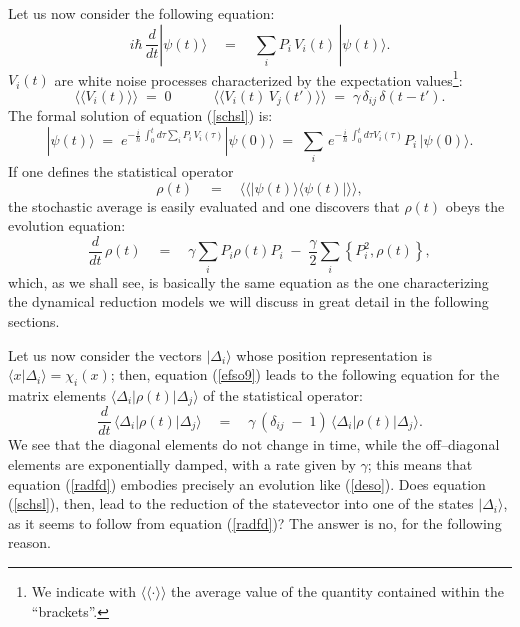 \documentclass[10pt,a4paper]{article}
\newcommand{\llangle}{\langle\!\langle}
\newcommand{\rrangle}{\rangle\!\rangle}
\begin{document}
Let us now consider the following equation:
\begin{equation} \label{schsl}
i\hbar\,\frac{d}{dt}|\psi(t)\rangle \quad = \quad \sum_{i} P_{i}
\, V_{i}(t)\, |\psi(t)\rangle.
\end{equation}
$V_{i}(t)$ are white noise processes characterized by the
expectation values\footnote{We indicate with $\llangle \cdot
\rrangle$ the average value of the quantity contained within the
``brackets''.}:
\begin{equation}
\llangle V_{i}(t) \rrangle \; = \; 0 \qquad\quad \llangle
V_{i}(t)\, V_{j}(t') \rrangle \; = \;
\gamma\,\delta_{ij}\,\delta(t-t').
\end{equation}
The formal solution of equation (\ref{schsl}) is:
\begin{equation}
|\psi(t)\rangle \; = \; e^{\displaystyle -\frac{i}{\hbar}\,
\int_{0}^{t} d\tau \sum_{i} P_{i}\, V_{i}(\tau)} |\psi(0)\rangle
\; = \; \sum_{i}\, e^{\displaystyle -\frac{i}{\hbar}\,
\int_{0}^{t} d\tau V_{i}(\tau)} P_{i}\, |\psi(0)\rangle.
\end{equation}
If one defines the statistical operator
\begin{equation} \label{sjsfhj}
\rho(t) \quad = \quad \llangle |\psi(t)\rangle\langle \psi(t)|
\rrangle,
\end{equation}
the stochastic average is easily evaluated and one discovers that
$\rho(t)$ obeys the evolution equation:
\begin{equation} \label{efso9}
\frac{d}{dt}\, \rho(t) \quad = \quad \gamma \sum_{i} P_{i} \rho(t)
P_{i} \; - \; \frac{\gamma}{2} \sum_{i} \left\{ P^{2}_{i}, \rho(t)
\right\},
\end{equation}
which, as we shall see, is basically the same equation as the one
characterizing the dynamical reduction models we will discuss in
great detail in the following sections.

Let us now consider the vectors $|\Delta_{i}\rangle$ whose
position representation is $\langle x |\Delta_{i}\rangle =
\chi_{i}(x)$; then, equation (\ref{efso9}) leads to the following
equation for the matrix elements
$\langle\Delta_{i}|\rho(t)|\Delta_{j}\rangle$ of the statistical
operator:
\begin{equation} \label{radfd}
\frac{d}{dt}\, \langle\Delta_{i}|\rho(t)|\Delta_{j}\rangle \quad =
\quad \gamma\,(\delta_{ij} \; - \; 1)\,
\langle\Delta_{i}|\rho(t)|\Delta_{j}\rangle.
\end{equation}
We see that the diagonal elements do not change in time, while the
off--diagonal elements are exponentially damped, with a rate given
by $\gamma$; this means that equation (\ref{radfd}) embodies
precisely an evolution like (\ref{deso}). Does equation
(\ref{schsl}), then,  lead to the reduction of the statevector
into one of the states $|\Delta_{i}\rangle$, as it seems to follow
from equation (\ref{radfd})? The answer is no, for the following
reason.
\end{document}

